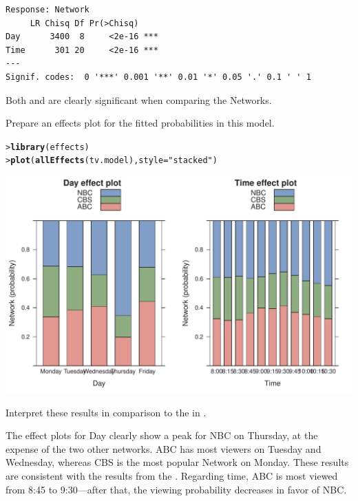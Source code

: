 \documentclass[10pt]{report}\usepackage[]{graphicx}\usepackage[]{color}
\makeatletter
\newcommand{\hlstr}[1]{\textcolor[rgb]{0.192,0.494,0.8}{#1}}%
\newcommand{\hlstd}[1]{\textcolor[rgb]{0.345,0.345,0.345}{#1}}%
\newcommand{\hlkwc}[1]{\textcolor[rgb]{0.333,0.667,0.333}{#1}}%
\newcommand{\hlkwd}[1]{\textcolor[rgb]{0.737,0.353,0.396}{\textbf{#1}}}%
\newenvironment{kframe}{%
 \def\at@end@of@kframe{}%
 \ifinner\ifhmode%
  \def\at@end@of@kframe{\end{minipage}}%
  \begin{minipage}{\columnwidth}%
 \fi\fi%
 \def\FrameCommand##1{\hskip\@totalleftmargin \hskip-\fboxsep
 \colorbox{shadecolor}{##1}\hskip-\fboxsep
     \hskip-\linewidth \hskip-\@totalleftmargin \hskip\columnwidth}%
 \MakeFramed {\advance\hsize-\width
   \@totalleftmargin\z@ \linewidth\hsize
   \@setminipage}}%
 {\par\unskip\endMakeFramed%
 \at@end@of@kframe}
\newenvironment{knitrout}{}{} %
\renewenvironment{knitrout}{\small\renewcommand{\baselinestretch}{.85}}{} %
\makeatother
\begin{document}
\begin{Exercises}
\begin{enumerate*}
\begin{ans}
\begin{knitrout}
\begin{kframe}
\begin{verbatim}
Response: Network
     LR Chisq Df Pr(>Chisq)    
Day      3400  8     <2e-16 ***
Time      301 20     <2e-16 ***
---
Signif. codes:  0 '***' 0.001 '**' 0.01 '*' 0.05 '.' 0.1 ' ' 1
\end{verbatim}
\end{kframe}
\end{knitrout}
      Both  and  are clearly significant when
      comparing the Networks.
    \end{ans}
    
    \item Prepare an effects plot for the fitted probabilities in this model.
    \begin{ans}
\begin{knitrout}\footnotesize
{}\color{fgcolor}\begin{kframe}
\begin{alltt}
\hlstd{> }\hlkwd{library}\hlstd{(effects)}
\hlstd{> }\hlkwd{plot}\hlstd{(}\hlkwd{allEffects}\hlstd{(tv.model),} \hlkwc{style} \hlstd{=} \hlstr{"stacked"}\hlstd{)}
\end{alltt}
\end{kframe}

\centerline{\includegraphics[width=.8\textwidth]{soln/fig/ex8-3b-1} }



\end{knitrout}
    \end{ans}
    
    \item Interpret these results in comparison to the \ca  in .
    \begin{ans}
      The effect plots for Day clearly show a peak for NBC on Thursday,
      at the expense of the two other networks. ABC has most viewers
      on Tuesday and Wednesday, whereas CBS is the most popular
      Network on Monday. These results are consistent with the results
      from the \ca. Regarding time, ABC
      is most viewed from 8:45 to 9:30---after that, the
      viewing probability decreases in favor of NBC.
    \end{ans}
    

\end{enumerate*}
\end{Exercises}
\end{document}
